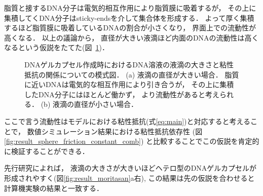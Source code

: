 脂質と接するDNA分子は電気的相互作用により脂質膜に吸着するが，
その上に集積してくDNA分子はsticky-endsを介して集合体を形成する．
よって厚く集積するほど脂質膜に吸着しているDNAの割合が小さくなり，
界面上での流動性が高くなる．
以上の議論から，
直径が大きい液滴ほど内面のDNAの流動性は高くなるという仮説をたてた(図~\ref{fig:size_and_friction})．
\begin{figure}
    \centering
    
    \caption{
        DNAゲルカプセル作成時におけるDNA溶液の液滴の大きさと粘性抵抗の関係についての模式図．
        (a) 液滴の直径が大きい場合．
            脂質に近いDNAは電気的な相互作用により引き合うが，
            その上に集積したDNA分子にはほとんど働かず，
            より流動性があると考えられる．
        (b) 液滴の直径が小さい場合．
    }
    \label{fig:size_and_friction}
\end{figure}
ここで言う流動性はモデルにおける粘性抵抗(式\ref{eq:main})と対応すると考えることで，
数値シミュレーション結果における粘性抵抗依存性
(図\ref{fig:result_sphere_friction_constant_comb})
と比較することでこの仮説を肯定的に検証することができる．

先行研究によれば，
液滴の大きさが大きいほどヘテロ型のDNAゲルカプセルが形成されやすく(図\ref{fig:result_moritasan}a右), 
この結果は先の仮説を合わせると計算機実験の結果と一致する．
